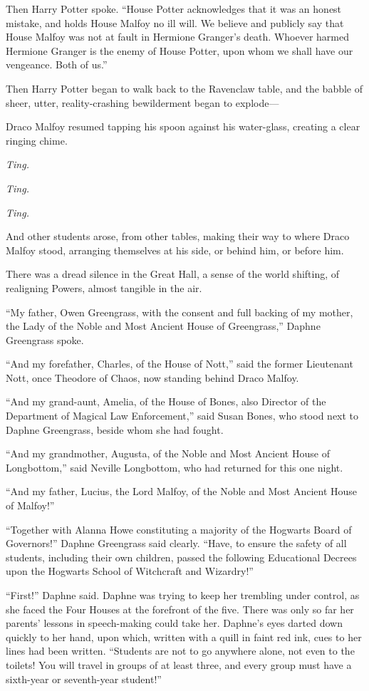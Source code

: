 Then Harry Potter spoke. “House Potter acknowledges that it was an honest mistake, and holds House Malfoy no ill will. We believe and publicly say that House Malfoy was not at fault in Hermione Granger’s death. Whoever harmed Hermione Granger is the enemy of House Potter, upon whom we shall have our vengeance. Both of us.”

Then Harry Potter began to walk back to the Ravenclaw table, and the babble of sheer, utter, reality-crashing bewilderment began to explode—

Draco Malfoy resumed tapping his spoon against his water-glass, creating a clear ringing chime.

\emph{Ting.}

\emph{Ting.}

\emph{Ting.}

And other students arose, from other tables, making their way to where Draco Malfoy stood, arranging themselves at his side, or behind him, or before him.

There was a dread silence in the Great Hall, a sense of the world shifting, of realigning Powers, almost tangible in the air.

“My father, Owen Greengrass, with the consent and full backing of my mother, the Lady of the Noble and Most Ancient House of Greengrass,” Daphne Greengrass spoke.

“And my forefather, Charles, of the House of Nott,” said the former Lieutenant Nott, once Theodore of Chaos, now standing behind Draco Malfoy.

“And my grand-aunt, Amelia, of the House of Bones, also Director of the Department of Magical Law Enforcement,” said Susan Bones, who stood next to Daphne Greengrass, beside whom she had fought.

“And my grandmother, Augusta, of the Noble and Most Ancient House of Longbottom,” said Neville Longbottom, who had returned for this one night.

“And my father, Lucius, the Lord Malfoy, of the Noble and Most Ancient House of Malfoy!”

“Together with Alanna Howe constituting a majority of the Hogwarts Board of Governors!” Daphne Greengrass said clearly. “Have, to ensure the safety of all students, including their own children, passed the following Educational Decrees upon the Hogwarts School of Witchcraft and Wizardry!”

\later

“First!” Daphne said. Daphne was trying to keep her trembling under control, as she faced the Four Houses at the forefront of the five. There was only so far her parents’ lessons in speech-making could take her. Daphne’s eyes darted down quickly to her hand, upon which, written with a quill in faint red ink, cues to her lines had been written. “Students are not to go anywhere alone, not even to the toilets! You will travel in groups of at least three, and every group must have a sixth-year or seventh-year student!”

